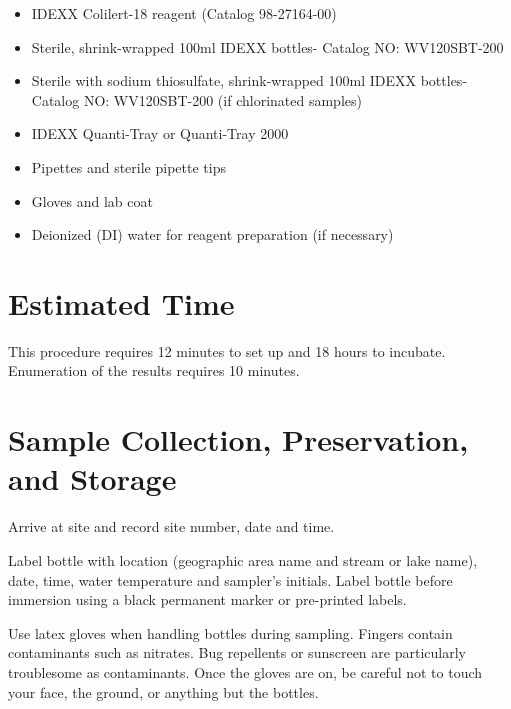 \documentclass[12pt]{../SOP4_alpha}\usepackage[]{graphicx}\usepackage[]{xcolor}
\begin{document}
\begin{itemize}
\item IDEXX Colilert-18 reagent (Catalog 98-27164-00)

\item Sterile, shrink-wrapped 100ml IDEXX bottles- Catalog NO: WV120SBT-200 

\item Sterile with sodium thiosulfate, shrink-wrapped 100ml IDEXX bottles- Catalog NO: WV120SBT-200 (if chlorinated samples)

\item IDEXX Quanti-Tray or Quanti-Tray 2000
\item Pipettes and sterile pipette tips

\item Gloves and lab coat

\item Deionized (DI) water for reagent preparation (if necessary)

\end{itemize}

\section{Estimated Time}

\NP This procedure requires 12 minutes to set up and 18 hours to incubate. Enumeration of the results requires 10 minutes.

\section{Sample Collection, Preservation, and Storage}

\NP  Arrive at site and record site number, date and time.


\NP Label bottle with location (geographic area name and stream or lake name),
date, time, water temperature and sampler's initials. Label bottle before
immersion using a black permanent marker or pre-printed labels. 

\NP Use latex gloves when handling bottles during sampling. Fingers contain
contaminants such as nitrates. Bug repellents or sunscreen are particularly 
troublesome as contaminants. Once the gloves are on, be careful not to touch
your face, the ground, or anything but the bottles.
\end{document}
